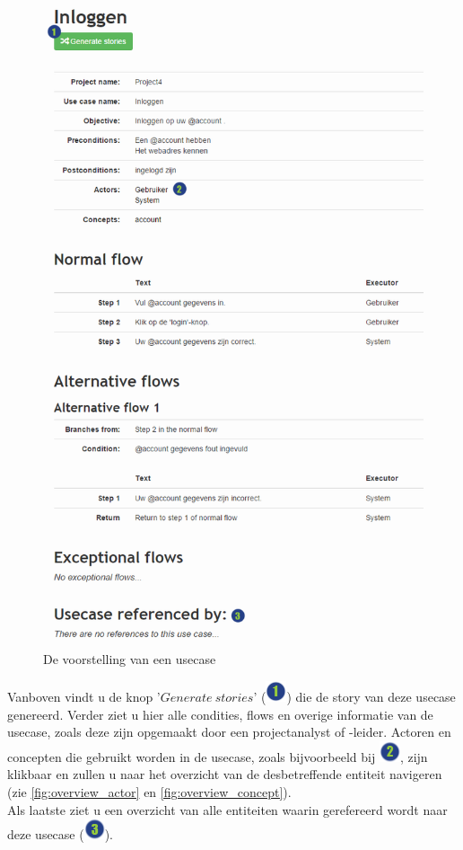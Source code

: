 \documentclass[a4paper,11pt]{article}
\newcommand{\one}{\includegraphics[scale=0.5]{Gebruikershandleiding_img/1.png}}
\newcommand{\two}{\includegraphics[scale=0.5]{Gebruikershandleiding_img/2.png}}
\newcommand{\three}{\includegraphics[scale=0.5]{Gebruikershandleiding_img/3.png}}
\begin{document}
\begin{figure}[H]
\centering
\includegraphics[scale=0.5]{Gebruikershandleiding_img/show_usecase.png}
\caption{De voorstelling van een usecase}
\label{fig:overview_usecase}
\end{figure}

Vanboven vindt u de knop '$Generate\ stories$' (\one) die de story van deze usecase genereerd. Verder ziet u hier alle condities, flows en overige informatie van de usecase, zoals deze zijn opgemaakt door een projectanalyst of -leider. Actoren en concepten die gebruikt worden in de usecase, zoals bijvoorbeeld bij \two , zijn klikbaar en zullen u naar het overzicht van de desbetreffende entiteit navigeren (zie \autoref{fig:overview_actor} en \ref{fig:overview_concept}).\\
Als laatste ziet u een overzicht van alle entiteiten waarin gerefereerd wordt naar deze usecase (\three).
\end{document}
